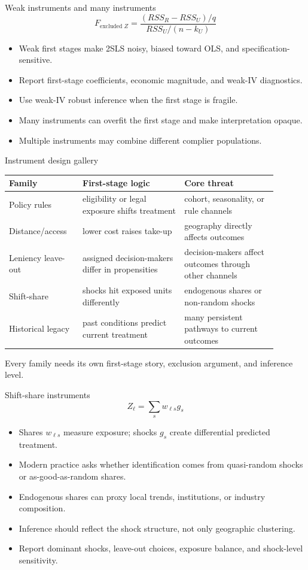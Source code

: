 \documentclass[aspectratio=169,11pt]{beamer}
\newcommand{\1}{\mathbf{1}}
\begin{document}
\begin{frame}{Weak instruments and many instruments}
\[
F_{\text{excluded }Z}
=
\frac{(RSS_R-RSS_U)/q}{RSS_U/(n-k_U)}
\]

\begin{itemize}
    \item Weak first stages make 2SLS noisy, biased toward OLS, and specification-sensitive.
    \item Report first-stage coefficients, economic magnitude, and weak-IV diagnostics.
    \item Use weak-IV robust inference when the first stage is fragile.
    \item Many instruments can overfit the first stage and make interpretation opaque.
    \item Multiple instruments may combine different complier populations.
\end{itemize}
\end{frame}

\begin{frame}{Instrument design gallery}
\small
\begin{tabular}{p{0.24\linewidth} p{0.34\linewidth} p{0.31\linewidth}}
\toprule
Family & First-stage logic & Core threat \\
\midrule
Policy rules & eligibility or legal exposure shifts treatment & cohort, seasonality, or rule channels \\
Distance/access & lower cost raises take-up & geography directly affects outcomes \\
Leniency leave-out & assigned decision-makers differ in propensities & decision-makers affect outcomes through other channels \\
Shift-share & shocks hit exposed units differently & endogenous shares or non-random shocks \\
Historical legacy & past conditions predict current treatment & many persistent pathways to current outcomes \\
\bottomrule
\end{tabular}

\medskip
Every family needs its own first-stage story, exclusion argument, and inference level.
\end{frame}

\begin{frame}{Shift-share instruments}
\[
Z_{\ell}=\sum_s w_{\ell s}g_s
\]

\begin{itemize}
    \item Shares $w_{\ell s}$ measure exposure; shocks $g_s$ create differential predicted treatment.
    \item Modern practice asks whether identification comes from quasi-random shocks or as-good-as-random shares.
    \item Endogenous shares can proxy local trends, institutions, or industry composition.
    \item Inference should reflect the shock structure, not only geographic clustering.
    \item Report dominant shocks, leave-out choices, exposure balance, and shock-level sensitivity.
\end{itemize}
\end{frame}
\end{document}
